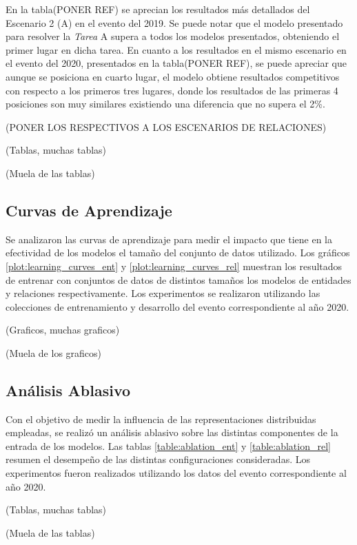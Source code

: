 En la tabla(PONER REF) se aprecian los resultados m\'as detallados del Escenario 2 (A) en el evento del 2019. Se puede notar que el modelo presentado para resolver la \emph{Tarea} A supera a todos los modelos presentados, obteniendo el primer lugar en dicha tarea. En cuanto a los resultados en el mismo escenario en el evento del 2020, presentados en la tabla(PONER REF), se puede apreciar que aunque se posiciona en cuarto lugar, el modelo obtiene resultados competitivos con respecto a los primeros tres lugares, donde los resultados de las primeras 4 posiciones son muy similares existiendo una diferencia que no supera el 2\%.

(PONER LOS RESPECTIVOS A LOS ESCENARIOS DE RELACIONES)
 
(Tablas, muchas tablas)

(Muela de las tablas)

\subsection{Curvas de Aprendizaje}

Se analizaron las curvas de aprendizaje para medir el impacto que tiene en la efectividad de los modelos el tamaño del conjunto de datos utilizado.
Los gráficos \ref{plot:learning_curves_ent} y \ref{plot:learning_curves_rel} muestran los resultados de entrenar con conjuntos de datos de distintos tamaños los modelos de entidades y relaciones respectivamente.
Los experimentos se realizaron utilizando las colecciones de entrenamiento y desarrollo del evento correspondiente al año 2020.

(Graficos, muchas graficos)

(Muela de los graficos)

\subsection{Análisis Ablasivo}

Con el objetivo de medir la influencia de las representaciones distribuidas empleadas, se realizó un análisis ablasivo sobre las distintas componentes de la entrada de los modelos.
Las tablas \ref{table:ablation_ent} y \ref{table:ablation_rel} resumen el desempeño de las distintas configuraciones consideradas.
Los experimentos fueron realizados utilizando los datos del evento correspondiente al año 2020.

(Tablas, muchas tablas)

(Muela de las tablas)

